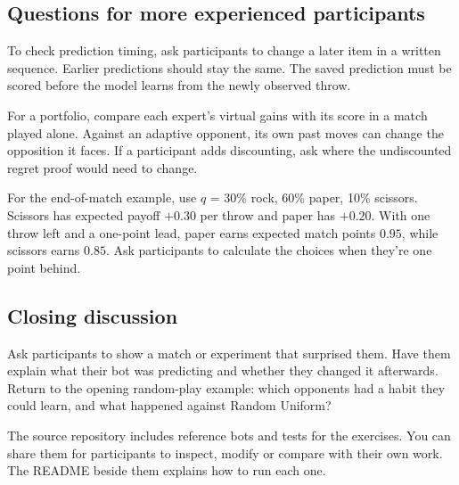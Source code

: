 \documentclass[11pt]{article}
\begin{document}
\subsection*{Questions for more experienced participants}

To check prediction timing, ask participants to change a later item in a written sequence. Earlier predictions should stay the same. The saved prediction must be scored before the model learns from the newly observed throw.


For a portfolio, compare each expert's virtual gains with its score in a match played alone. Against an adaptive opponent, its own past moves can change the opposition it faces. If a participant adds discounting, ask where the undiscounted regret proof would need to change.


For the end-of-match example, use $q$ = 30\% rock, 60\% paper, 10\% scissors. Scissors has expected payoff $+0.30$ per throw and paper has $+0.20$. With one throw left and a one-point lead, paper earns expected match points $0.95$, while scissors earns $0.85$. Ask participants to calculate the choices when they're one point behind.


\subsection*{Closing discussion}

Ask participants to show a match or experiment that surprised them. Have them explain what their bot was predicting and whether they changed it afterwards. Return to the opening random-play example: which opponents had a habit they could learn, and what happened against Random Uniform?


The source repository includes reference bots and tests for the exercises. You can share them for participants to inspect, modify or compare with their own work. The README beside them explains how to run each one.
\par
\end{document}
